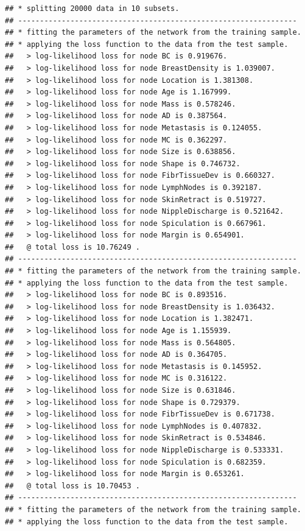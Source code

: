 \documentclass[]{article}
\begin{document}
\begin{verbatim}
## * splitting 20000 data in 10 subsets.
## ----------------------------------------------------------------
## * fitting the parameters of the network from the training sample.
## * applying the loss function to the data from the test sample.
##   > log-likelihood loss for node BC is 0.919676.
##   > log-likelihood loss for node BreastDensity is 1.039007.
##   > log-likelihood loss for node Location is 1.381308.
##   > log-likelihood loss for node Age is 1.167999.
##   > log-likelihood loss for node Mass is 0.578246.
##   > log-likelihood loss for node AD is 0.387564.
##   > log-likelihood loss for node Metastasis is 0.124055.
##   > log-likelihood loss for node MC is 0.362297.
##   > log-likelihood loss for node Size is 0.638856.
##   > log-likelihood loss for node Shape is 0.746732.
##   > log-likelihood loss for node FibrTissueDev is 0.660327.
##   > log-likelihood loss for node LymphNodes is 0.392187.
##   > log-likelihood loss for node SkinRetract is 0.519727.
##   > log-likelihood loss for node NippleDischarge is 0.521642.
##   > log-likelihood loss for node Spiculation is 0.667961.
##   > log-likelihood loss for node Margin is 0.654901.
##   @ total loss is 10.76249 .
## ----------------------------------------------------------------
## * fitting the parameters of the network from the training sample.
## * applying the loss function to the data from the test sample.
##   > log-likelihood loss for node BC is 0.893516.
##   > log-likelihood loss for node BreastDensity is 1.036432.
##   > log-likelihood loss for node Location is 1.382471.
##   > log-likelihood loss for node Age is 1.155939.
##   > log-likelihood loss for node Mass is 0.564805.
##   > log-likelihood loss for node AD is 0.364705.
##   > log-likelihood loss for node Metastasis is 0.145952.
##   > log-likelihood loss for node MC is 0.316122.
##   > log-likelihood loss for node Size is 0.631846.
##   > log-likelihood loss for node Shape is 0.729379.
##   > log-likelihood loss for node FibrTissueDev is 0.671738.
##   > log-likelihood loss for node LymphNodes is 0.407832.
##   > log-likelihood loss for node SkinRetract is 0.534846.
##   > log-likelihood loss for node NippleDischarge is 0.533331.
##   > log-likelihood loss for node Spiculation is 0.682359.
##   > log-likelihood loss for node Margin is 0.653261.
##   @ total loss is 10.70453 .
## ----------------------------------------------------------------
## * fitting the parameters of the network from the training sample.
## * applying the loss function to the data from the test sample.

\end{verbatim}
\end{document}
